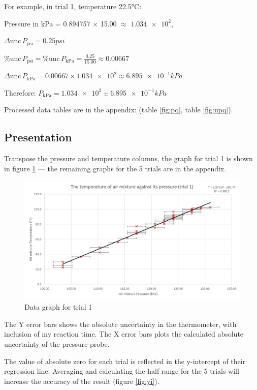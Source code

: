 \documentclass[a4paper,12pt]{article}
\newcommand{\absun}{\Delta \text{unc}\,}
\newcommand{\relun}{\% \text{unc}\,}
\begin{document}
For example, in trial 1, temperature 22.5$\si{\celsius}$:

Pressure in kPa = 0.894757 $\times$ 15.00 $\approx$ $\num{1.034e+2}$,

$\absun P_{\text{psi}} = 0.25\si{psi}$

$\relun P_{\text{psi}} = \relun P_{\text{kPa}} =  \frac{0.25}{15.00} \approx 0.00667$

$\absun P_{\text{kPa}} = 0.00667 \times \num{1.034e+2} \approx \num{6.895e-1} \si{kPa}$

Therefore: $P_{\text{kPa}} = \num{1.034e+2} \pm \num{6.895e-1} \si{kPa}$


Processed data tables are in the appendix: (table \ref{fig:pq}, table \ref{fig:upq}).

\subsection{Presentation}

Transpose the pressure and temperature columns, the graph for trial 1 is shown in figure \ref{fig:t1} --- the remaining graphs for the 5 trials are in the appendix.

\begin{figure}[H]
    \centering
    \includegraphics[width=\textwidth]{assets/graph1.png}
    \caption{Data graph for trial 1}
    \label{fig:t1}
\end{figure}

The Y error bars shows the absolute uncertainty in the thermometer, with inclusion of my reaction time. The X error bars plots the calculated absolute uncertainty of the pressure probe.

The value of absolute zero for each trial is reflected in the y-intercept of their regression line. Averaging and calculating the half range for the 5 trials will increase the accuracy of the result (figure \ref{fig:yi}).
\end{document}
